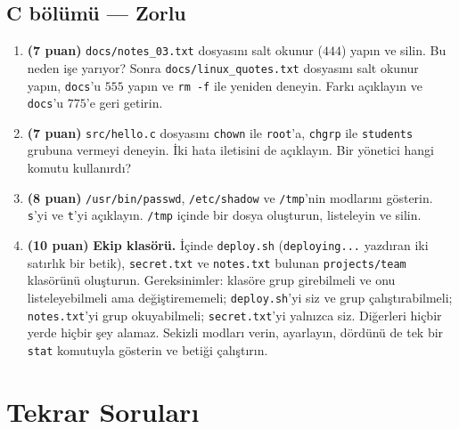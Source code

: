 \documentclass[11pt,a4paper]{article}
\newcommand{\cmd}[1]{\texttt{#1}}
\begin{document}
\subsection*{C bölümü --- Zorlu}
\begin{enumerate}[leftmargin=1.8em,label=\textbf{\arabic*.},resume]
  \item \textbf{(7 puan)} \texttt{docs/notes\_03.txt} dosyasını salt okunur ($444$) yapın ve silin. Bu neden işe yarıyor? Sonra \texttt{docs/linux\_quotes.txt} dosyasını salt okunur yapın, \texttt{docs}'u $555$ yapın ve \cmd{rm -f} ile yeniden deneyin. Farkı açıklayın ve \texttt{docs}'u $775$'e geri getirin.
  \item \textbf{(7 puan)} \texttt{src/hello.c} dosyasını \cmd{chown} ile \texttt{root}'a, \cmd{chgrp} ile \texttt{students} grubuna vermeyi deneyin. İki hata iletisini de açıklayın. Bir yönetici hangi komutu kullanırdı?
  \item \textbf{(8 puan)} \texttt{/usr/bin/passwd}, \texttt{/etc/shadow} ve \texttt{/tmp}'nin modlarını gösterin. \texttt{s}'yi ve \texttt{t}'yi açıklayın. \texttt{/tmp} içinde bir dosya oluşturun, listeleyin ve silin.
  \item \textbf{(10 puan)} \textbf{Ekip klasörü.} İçinde \texttt{deploy.sh} (\texttt{deploying...} yazdıran iki satırlık bir betik), \texttt{secret.txt} ve \texttt{notes.txt} bulunan \texttt{projects/team} klasörünü oluşturun. Gereksinimler: klasöre grup girebilmeli ve onu listeleyebilmeli ama değiştirememeli; \texttt{deploy.sh}'yi siz ve grup çalıştırabilmeli; \texttt{notes.txt}'yi grup okuyabilmeli; \texttt{secret.txt}'yi yalnızca siz. Diğerleri hiçbir yerde hiçbir şey alamaz. Sekizli modları verin, ayarlayın, dördünü de tek bir \cmd{stat} komutuyla gösterin ve betiği çalıştırın.
\end{enumerate}

\section{Tekrar Soruları}
\end{document}
